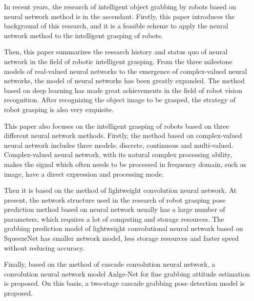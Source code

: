\documentclass[no-math, withoutpreface]{YangThesis}
\begin{document}
\begin{abstracten}

In recent years, the research of intelligent object grabbing by robots based on neural network method is in the ascendant. Firstly, this paper introduces the background of this research, and it is a feasible scheme to apply the neural network method to the intelligent grasping of robots. 

Then, this paper summarizes the research history and status quo of neural network in the field of robotic intelligent grasping. From the three milestone models of real-valued neural networks to the emergence of complex-valued neural networks, the model of neural networks has been greatly expanded. The method based on deep learning has made great achievements in the field of robot vision recognition. After recognizing the object image to be grasped, the strategy of robot grasping is also very exquisite. 

This paper also focuses on the intelligent grasping of robots based on three different neural network methods. Firstly, the method based on complex-valued neural network includes three models: discrete, continuous and multi-valued. Complex-valued neural network, with its natural complex processing ability, makes the signal which often needs to be processed in frequency domain, such as image, have a direct expression and processing mode. 

Then it is based on the method of lightweight convolution neural network. At present, the network structure used in the research of robot grasping pose prediction method based on neural network usually has a large number of parameters, which requires a lot of computing and storage resources. The grabbing prediction model of lightweight convolutional neural network based on SqueezeNet has smaller network model, less storage resources and faster speed without reducing accuracy. 

Finally, based on the method of cascade convolution neural network, a convolution neural network model Anlge-Net for fine grabbing attitude estimation is proposed. On this basis, a two-stage cascade grabbing pose detection model is proposed.

\end{abstracten}

\vspace{-1.3cm}
\end{document}

